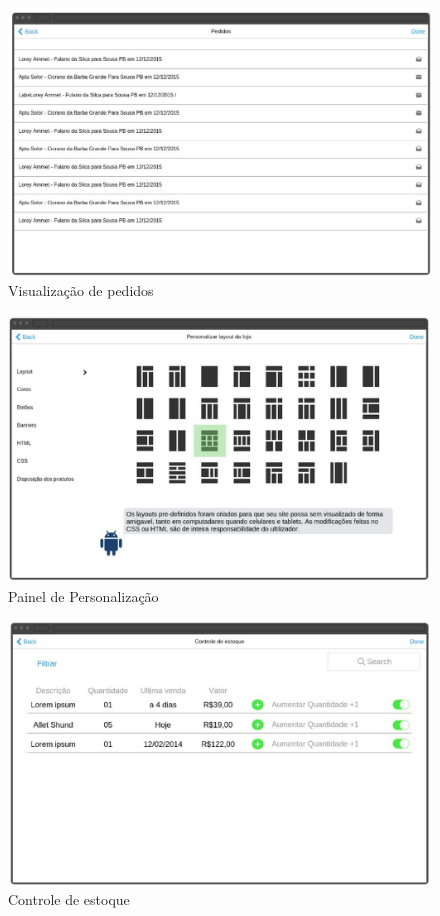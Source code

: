\documentclass[a4paper,12pt]{monografia}
\begin{document}
\begin{figure}[H]
\centering
\includegraphics[width=12cm]{img/prototipos/visualizacao-pedido.eps}
\caption{Visualização de pedidos}
\label{figura:visualizacao_pedidos}
\end{figure}

\begin{figure}[H]
\centering
\includegraphics[width=12cm]{img/prototipos/painel-personalizacao.eps}
\caption{Painel de Personalização}
\label{figura:painel_personalizacao}
\end{figure}

\begin{figure}[H]
\centering
\includegraphics[width=12cm]{img/prototipos/estoque.eps}
\caption{Controle de estoque}
\label{figura:controle_estoque}
\end{figure}
\end{document}
